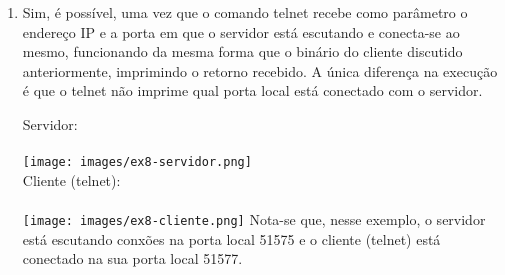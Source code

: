 \documentclass[12pt,a4paper]{report}
\begin{document}
\begin{enumerate}
    \item Sim, é possível, uma vez que o comando telnet recebe como parâmetro o endereço IP e a porta em que o servidor está escutando e conecta-se ao mesmo, funcionando da mesma forma que o binário do cliente discutido anteriormente, imprimindo o retorno recebido. A única diferença na execução é que o telnet não imprime qual porta local está conectado com o servidor.
    
    Servidor:\\\\
    \texttt{[image: images/ex8-servidor.png]}\\
    Cliente (telnet):\\\\
    \texttt{[image: images/ex8-cliente.png]}
    Nota-se que, nesse exemplo, o servidor está escutando conxões na porta local 51575 e o cliente (telnet) está conectado na sua porta local 51577.
\end{enumerate}
\end{document}
